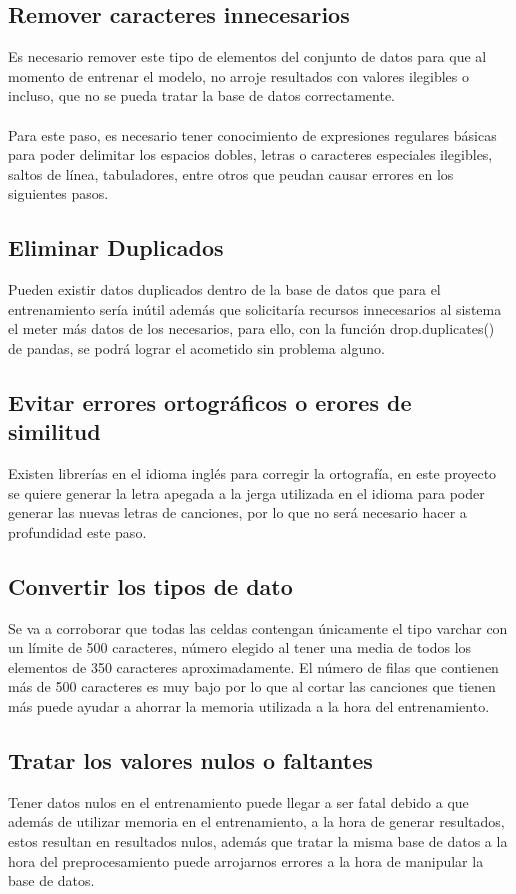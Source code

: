 \documentclass[12pt, a4paper, titlepage]{report}
\begin{document}
		\subsection{Remover caracteres  innecesarios} 
		Es necesario remover este tipo de elementos del conjunto de datos para que al momento de entrenar el modelo, no arroje resultados con valores ilegibles o incluso, que no se pueda tratar la base de datos correctamente.\\\\
		Para este paso, es necesario tener conocimiento de expresiones regulares básicas para poder delimitar los espacios dobles, letras o caracteres especiales ilegibles, saltos de línea, tabuladores, entre otros que peudan causar errores en los siguientes pasos.
		
		\subsection{Eliminar Duplicados} 
		Pueden existir datos duplicados dentro de la base de datos que para el entrenamiento sería inútil además que solicitaría recursos innecesarios al sistema el meter más datos de los necesarios, para ello, con la función drop.duplicates() de pandas, se podrá lograr el acometido sin problema alguno.
		
		\subsection{Evitar errores ortográficos o erores de similitud}
		Existen librerías en el idioma inglés para corregir la ortografía, en este proyecto se quiere generar la letra apegada a la jerga utilizada en el idioma para poder generar las nuevas letras de canciones, por lo que no será necesario hacer a profundidad este paso.
		
		\subsection{Convertir los tipos de dato} 
		Se va a corroborar que todas las celdas contengan únicamente el tipo varchar con un límite de 500 caracteres, número elegido al tener una media de todos los elementos de 350 caracteres aproximadamente. El número de filas que contienen más de 500 caracteres es muy bajo por lo que al cortar las canciones que tienen más puede ayudar a ahorrar la memoria utilizada a la hora del entrenamiento.
		\subsection{Tratar los valores nulos o faltantes} 
		Tener datos nulos en el entrenamiento puede llegar a ser fatal debido a que además de utilizar memoria en el entrenamiento, a la hora de generar resultados, estos resultan en resultados nulos, además que tratar la misma base de datos a la hora del preprocesamiento puede arrojarnos errores a la hora de manipular la base de datos.
		
\end{document}
